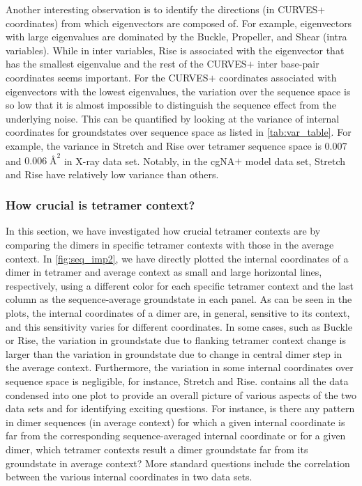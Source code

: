Another interesting observation is to identify the directions (in CURVES$+$ coordinates) from which eigenvectors are composed of. 
For example, eigenvectors with large eigenvalues are dominated by the Buckle, Propeller, and Shear (intra variables). While in inter variables, Rise is associated with the eigenvector that has the smallest eigenvalue and the rest of the CURVES$+$ inter base-pair coordinates seems important.
For the CURVES$+$ coordinates associated with eigenvectors with the lowest eigenvalues, the variation over the sequence space is so low that it is almost impossible to distinguish the sequence effect from the underlying noise.
This can be quantified by looking at the variance of internal coordinates for groundstates over sequence space as listed in \cref{tab:var_table}.
For example, the variance in Stretch and Rise over tetramer sequence space is $0.007$ and $0.006 \; \text{\AA}^2$ in X-ray data set. 
Notably, in the cgNA$+$ model data set, Stretch and Rise have relatively low variance than others.

\subsubsection{How crucial is tetramer context?}
In this section, we have investigated how crucial tetramer contexts are by comparing the dimers in specific tetramer contexts with those in the average context.
In \cref{fig:seq_imp2}, we have directly plotted the internal coordinates of a dimer in tetramer and average context as small and large horizontal lines, respectively, using a different color for each specific tetramer context and the last column as the sequence-average groundstate in each panel.
As can be seen in the plots, the internal coordinates of a dimer are, in general, sensitive to its context, and this sensitivity varies for different coordinates. 
In some cases, such as Buckle or Rise, the variation in groundstate due to flanking tetramer context change is larger than the variation in groundstate due to change in central dimer step in the average context.
Furthermore, the variation in some internal coordinates over sequence space is negligible, for instance, Stretch and Rise.
 contains all the data condensed into one plot to provide an overall picture of various aspects of the two data sets and for identifying exciting questions.
For instance, is there any pattern in dimer sequences (in average context) for which a given internal coordinate is far from the corresponding sequence-averaged internal coordinate or for a given dimer, which tetramer contexts result a dimer groundstate far from its groundstate in average context?
More standard questions include the correlation between the various internal coordinates in two data sets.

